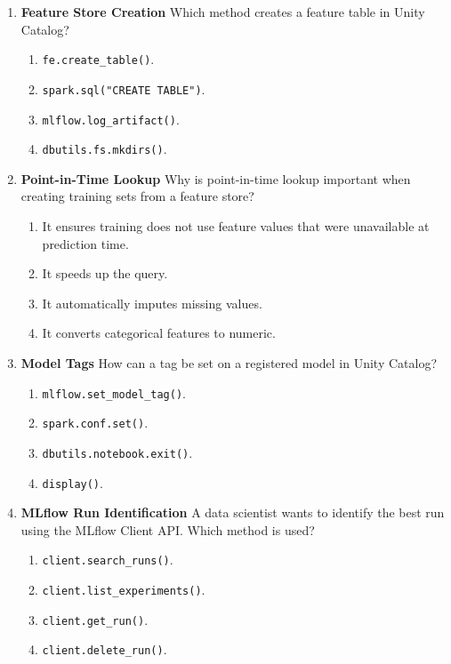 \documentclass{article}
\begin{document}
\begin{enumerate}[label=\textbf{Q\arabic*.}]
		\item \textbf{Feature Store Creation}
		Which method creates a feature table in Unity Catalog?
		\begin{enumerate}[label=\Alph*.]
			\item \texttt{fe.create\_table()}.
			\item \texttt{spark.sql("CREATE TABLE")}.
			\item \texttt{mlflow.log\_artifact()}.
			\item \texttt{dbutils.fs.mkdirs()}.
		\end{enumerate}
		
		\item \textbf{Point-in-Time Lookup}
		Why is point-in-time lookup important when creating training sets from a feature store?
		\begin{enumerate}[label=\Alph*.]
			\item It ensures training does not use feature values that were unavailable at prediction time.
			\item It speeds up the query.
			\item It automatically imputes missing values.
			\item It converts categorical features to numeric.
		\end{enumerate}
		
		\item \textbf{Model Tags}
		How can a tag be set on a registered model in Unity Catalog?
		\begin{enumerate}[label=\Alph*.]
			\item \texttt{mlflow.set\_model\_tag()}.
			\item \texttt{spark.conf.set()}.
			\item \texttt{dbutils.notebook.exit()}.
			\item \texttt{display()}.
		\end{enumerate}
		
		\item \textbf{MLflow Run Identification}
		A data scientist wants to identify the best run using the MLflow Client API. Which method is used?
		\begin{enumerate}[label=\Alph*.]
			\item \texttt{client.search\_runs()}.
			\item \texttt{client.list\_experiments()}.
			\item \texttt{client.get\_run()}.
			\item \texttt{client.delete\_run()}.
		\end{enumerate}
		

\end{enumerate}
\end{document}
